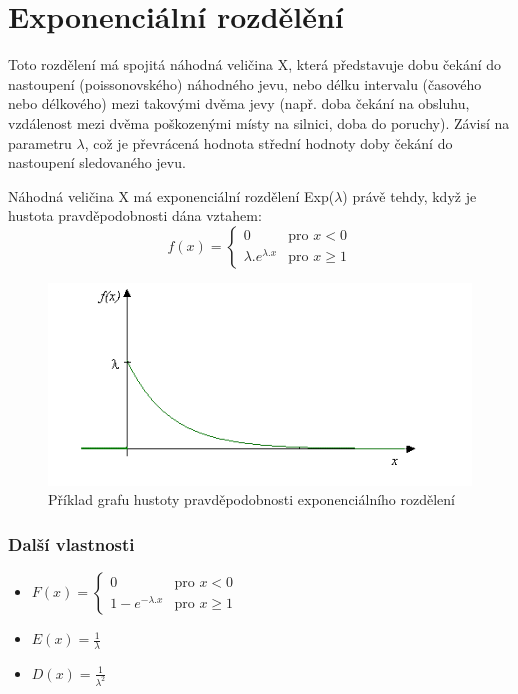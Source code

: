 \documentclass[FM,RP]{tulthesis}
\begin{document}
    \section{Exponenciální rozdělění}
        Toto rozdělení má spojitá náhodná veličina X, která představuje dobu čekání do nastoupení (poissonovského) náhodného jevu, 
        nebo délku intervalu (časového nebo délkového) mezi takovými dvěma jevy (např. doba čekání na obsluhu, vzdálenost mezi dvěma poškozenými místy na silnici, doba do poruchy).
        Závisí na parametru $ \lambda $, což je převrácená hodnota střední hodnoty doby čekání do nastoupení sledovaného jevu. \cite{7}

        Náhodná veličina X má exponenciální rozdělení Exp($ \lambda $) právě tehdy, když je hustota pravděpodobnosti dána vztahem:
        $$  f(x) = \left\{ \begin{array}{ll}
            0 & \mbox{pro }x<0 \\
            \lambda.e^{\lambda.x} & \mbox{pro }x\geq 1
            \end{array} \right. $$
            \begin{figure}[h]
                \centering
                \includegraphics[scale=0.75]{pic/hustota.png}
                \caption{Příklad grafu hustoty pravděpodobnosti exponenciálního rozdělení} \label{Obrázek č. 2.1}
            \end{figure}

        \subsubsection*{Další vlastnosti}
        \begin{itemize} 
        \item
            $  F(x) = \left\{ \begin{array}{ll}
                0 & \mbox{pro }x<0 \\
                1-e^{-\lambda.x} & \mbox{pro }x\geq 1
                \end{array} \right. $
        \item
            $ E(x) = \frac{1}{\lambda}  $
        \item
            $ D(x) = \frac{1}{\lambda^{2}}  $

        \end{itemize}
\end{document}
